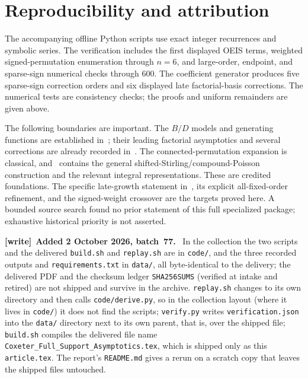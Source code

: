 \documentclass[11pt]{article}
\newenvironment{writenote}[1][]{\par\smallskip\begingroup\small
 \noindent\textbf{[write]}\if\relax\detokenize{#1}\relax\else~\textbf{#1.}\fi\ }%
 {\par\endgroup\smallskip}
\begin{document}
\section{Reproducibility and attribution}\label{fss:sec:repro}
The accompanying offline Python scripts use exact integer recurrences and symbolic series. The verification includes the first displayed OEIS terms, weighted signed-permutation enumeration through $n=6$, and large-order, endpoint, and sparse-sign numerical checks through $600$. The coefficient generator produces five sparse-sign correction orders and six displayed late factorial-basis corrections. The numerical tests are consistency checks; the proofs and uniform remainders are given above.

The following boundaries are important. The $B/D$ models and generating functions are established in~\cite{BHZ}; their leading factorial asymptotics and several corrections are already recorded in~\cite{OEISB,OEISD}. The connected-permutation expansion is classical, and~\cite{MK} contains the general shifted-Stirling/compound-Poisson construction and the relevant integral representations. These are credited foundations. The specific late-growth statement in~\cite{OEISLate}, its explicit all-fixed-order refinement, and the signed-weight crossover are the targets proved here. A bounded source search found no prior statement of this full specialized package; exhaustive historical priority is not asserted.

\begin{writenote}[Added 2 October 2026, batch~77]
In the collection the two scripts and the delivered \texttt{build.sh} and
\texttt{replay.sh} are in \texttt{code/}, and the three recorded outputs and
\texttt{requirements.txt} in \texttt{data/}, all byte-identical to the
delivery; the delivered PDF and the checksum ledger \texttt{SHA256SUMS}
(verified at intake and retired) are not shipped and survive in the
archive. \texttt{replay.sh} changes to its own directory and then calls
\texttt{code/derive.py}, so in the collection layout (where it lives in
\texttt{code/}) it does not find the scripts; \texttt{verify.py} writes
\texttt{verification.json} into the \texttt{data/} directory next to its
own parent, that is, over the shipped file; \texttt{build.sh} compiles the
delivered file name \texttt{Coxeter\_\allowbreak Full\_\allowbreak Support\_\allowbreak Asymptotics.tex},
which is shipped only as this \texttt{article.tex}. The report's
\texttt{README.md} gives a rerun on a scratch copy that leaves the shipped
files untouched.
\end{writenote}
\end{document}
